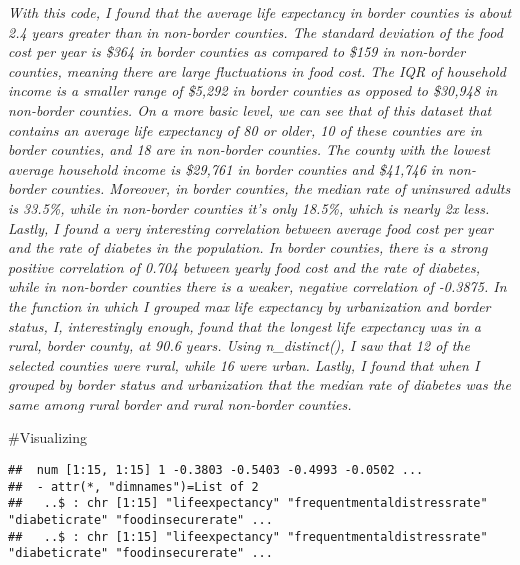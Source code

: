 \documentclass[]{article}
\newenvironment{Shaded}{\begin{snugshade}}{\end{snugshade}}
\newcommand{\CommentTok}[1]{\textcolor[rgb]{0.56,0.35,0.01}{\textit{#1}}}
\newcommand{\KeywordTok}[1]{\textcolor[rgb]{0.13,0.29,0.53}{\textbf{#1}}}
\newcommand{\NormalTok}[1]{#1}
\newcommand{\OperatorTok}[1]{\textcolor[rgb]{0.81,0.36,0.00}{\textbf{#1}}}
\newcommand{\StringTok}[1]{\textcolor[rgb]{0.31,0.60,0.02}{#1}}
\begin{document}
\emph{With this code, I found that the average life expectancy in border
counties is about 2.4 years greater than in non-border counties. The
standard deviation of the food cost per year is \$364 in border counties
as compared to \$159 in non-border counties, meaning there are large
fluctuations in food cost. The IQR of household income is a smaller
range of \$5,292 in border counties as opposed to \$30,948 in non-border
counties. On a more basic level, we can see that of this dataset that
contains an average life expectancy of 80 or older, 10 of these counties
are in border counties, and 18 are in non-border counties. The county
with the lowest average household income is \$29,761 in border counties
and \$41,746 in non-border counties. Moreover, in border counties, the
median rate of uninsured adults is 33.5\%, while in non-border counties
it's only 18.5\%, which is nearly 2x less. Lastly, I found a very
interesting correlation between average food cost per year and the rate
of diabetes in the population. In border counties, there is a strong
positive correlation of 0.704 between yearly food cost and the rate of
diabetes, while in non-border counties there is a weaker, negative
correlation of -0.3875. In the function in which I grouped max life
expectancy by urbanization and border status, I, interestingly enough,
found that the longest life expectancy was in a rural, border county, at
90.6 years. Using n\_distinct(), I saw that 12 of the selected counties
were rural, while 16 were urban. Lastly, I found that when I grouped by
border status and urbanization that the median rate of diabetes was the
same among rural border and rural non-border counties.}

\#Visualizing

\begin{Shaded}
\end{Shaded}

\begin{verbatim}
##  num [1:15, 1:15] 1 -0.3803 -0.5403 -0.4993 -0.0502 ...
##  - attr(*, "dimnames")=List of 2
##   ..$ : chr [1:15] "lifeexpectancy" "frequentmentaldistressrate" "diabeticrate" "foodinsecurerate" ...
##   ..$ : chr [1:15] "lifeexpectancy" "frequentmentaldistressrate" "diabeticrate" "foodinsecurerate" ...
\end{verbatim}
\end{document}
